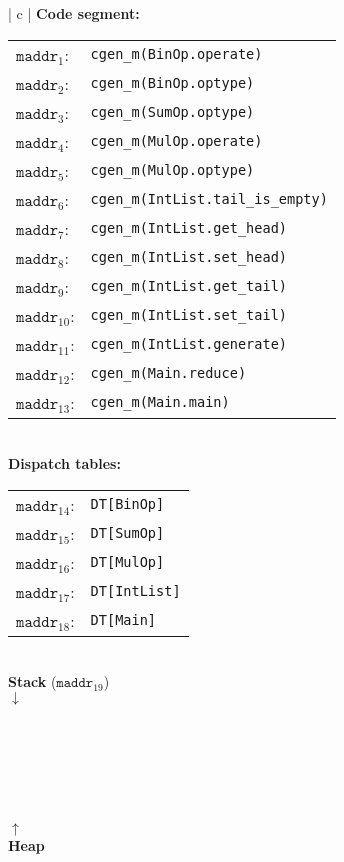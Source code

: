 \documentclass[11pt]{article}
\begin{document}
\begin{enumerate}
  \begin{tabular}{ | c | }
  \hline
  \textbf{Code segment:} \\
  \begin{tabular}{ | R{2cm} | L{9cm} |}
  \hline
  $\mathtt{maddr}_1$: & \texttt{cgen\_m(BinOp.operate)} \\
  $\mathtt{maddr}_2$: & \texttt{cgen\_m(BinOp.optype)} \\
  $\mathtt{maddr}_3$: & \texttt{cgen\_m(SumOp.optype)} \\
  $\mathtt{maddr}_4$: & \texttt{cgen\_m(MulOp.operate)} \\
  $\mathtt{maddr}_5$: & \texttt{cgen\_m(MulOp.optype)} \\
  $\mathtt{maddr}_6$: & \texttt{cgen\_m(IntList.tail\_is\_empty)} \\
  $\mathtt{maddr}_7$: & \texttt{cgen\_m(IntList.get\_head)} \\
  $\mathtt{maddr}_8$: & \texttt{cgen\_m(IntList.set\_head)} \\
  $\mathtt{maddr}_9$: & \texttt{cgen\_m(IntList.get\_tail)} \\
  $\mathtt{maddr}_{10}$: & \texttt{cgen\_m(IntList.set\_tail)} \\
  $\mathtt{maddr}_{11}$: & \texttt{cgen\_m(IntList.generate)} \\
  $\mathtt{maddr}_{12}$: & \texttt{cgen\_m(Main.reduce)} \\
  $\mathtt{maddr}_{13}$: & \texttt{cgen\_m(Main.main)} \\
  \hline
  \end{tabular} \\
  \textbf{Dispatch tables:} \\
  \begin{tabular}{ | R{2cm} | L{9cm} |}
  \hline
  $\mathtt{maddr}_{14}$: & \texttt{DT[BinOp]} \\
  $\mathtt{maddr}_{15}$: & \texttt{DT[SumOp]} \\
  $\mathtt{maddr}_{16}$: & \texttt{DT[MulOp]} \\
  $\mathtt{maddr}_{17}$: & \texttt{DT[IntList]} \\
  $\mathtt{maddr}_{18}$: & \texttt{DT[Main]} \\
  \hline
  \end{tabular} \\
  \textbf{Stack} ($\mathtt{maddr}_{19}$) \\
  $\downarrow$ \\
  \\
  \\
  \\
  \hline
  \\
  \\
  \\
  $\uparrow$ \\
  \textbf{Heap} \\
  \hline
  \end{tabular}
  

\end{enumerate}
\end{document}
